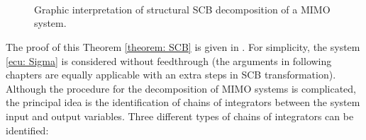 \documentclass[11pt,letterpaper,twoside,openright]{report}
\begin{document}
\begin{figure}[H]
	\centering
	 \\
	 \\
	 \\
	\caption{Graphic interpretation of structural SCB decomposition of a MIMO system.}
	\label{fig: SCB}
\end{figure}

The proof of this Theorem \ref*{theorem: SCB} is given in \cite{Chen2004}. For simplicity, the system \eqref{ecu: Sigma} is considered without feedthrough (the arguments in following chapters are equally applicable with an extra steps in SCB transformation). Although the procedure for the decomposition of MIMO systems is complicated, the principal idea is the identification of chains of integrators between the system input and output variables. Three different types of chains of integrators can be identified:
\end{document}
